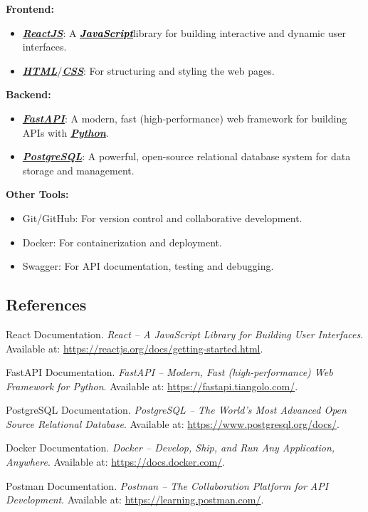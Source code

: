\documentclass[11pt]{article}
\newcommand{\JavaScript}{\href{https://www.javascript.com/}{\textbf{\colorbox{javascriptColor}{\textcolor{black}{\textit{JavaScript}}}}}}
\newcommand{\HTML}{\href{https://html.com/}{\textbf{\textcolor{htmlColor}{\textit{HTML}}}}}
\newcommand{\CSS}{\href{https://www.w3schools.com/css/}{\textbf{\textcolor{cssColor}{\textit{CSS}}}}}
\newcommand{\ReactJS}{\href{https://react.dev/}{\textbf{\textcolor{reactColor}{\textit{ReactJS}}}}}
\newcommand{\FastAPI}{\href{https://fastapi.tiangolo.com/}{\textbf{{\textcolor{fastAPIColor}{\textit{FastAPI}}}}}}
\newcommand{\PostgreSQL}{\href{https://www.postgresql.org/}{\textbf{{\textcolor{postgresColor}{\textit{PostgreSQL}}}}}}
\newcommand{\Python}{\href{https://www.python.org/}{\textbf{{\textcolor{pythonColor}{\textit{Python}}}}}}
\begin{document}
\textbf{Frontend:}
\begin{itemize}
    \item \ReactJS: A \JavaScript\space library for building interactive and dynamic user interfaces.
    \item \HTML/\CSS: For structuring and styling the web pages.
\end{itemize}

\textbf{Backend:}
\begin{itemize}
    \item \FastAPI: A modern, fast (high-performance) web framework for building APIs with \Python.
    \item \PostgreSQL: A powerful, open-source relational database system for data storage and management.
\end{itemize}

\textbf{Other Tools:}
\begin{itemize}
    \item Git/GitHub: For version control and collaborative development.
    \item Docker: For containerization and deployment.
    \item Swagger: For API documentation, testing and debugging.
\end{itemize}


\subsection{References}

\begin{thebibliography}{99}

 React Documentation. \textit{React – A JavaScript Library for Building User Interfaces}. Available at: \url{https://reactjs.org/docs/getting-started.html}.

 FastAPI Documentation. \textit{FastAPI – Modern, Fast (high-performance) Web Framework for Python}. Available at: \url{https://fastapi.tiangolo.com/}.

 PostgreSQL Documentation. \textit{PostgreSQL – The World's Most Advanced Open Source Relational Database}. Available at: \url{https://www.postgresql.org/docs/}.

 Docker Documentation. \textit{Docker – Develop, Ship, and Run Any Application, Anywhere}. Available at: \url{https://docs.docker.com/}.

 Postman Documentation. \textit{Postman – The Collaboration Platform for API Development}. Available at: \url{https://learning.postman.com/}.

\end{thebibliography}
\end{document}
